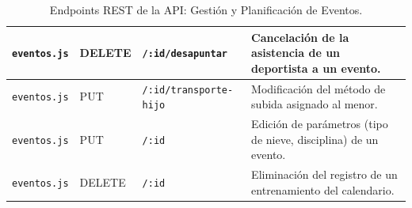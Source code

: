 \begin{table}[htbp]
\begin{tabularx}{\textwidth}{|l|l|l|X|}
        \texttt{eventos.js} & DELETE & \texttt{/:id/desapuntar} & Cancelación de la asistencia de un deportista a un evento. \\ \hline
        \texttt{eventos.js} & PUT & \texttt{/:id/transporte-hijo} & Modificación del método de subida asignado al menor. \\ \hline
        \texttt{eventos.js} & PUT & \texttt{/:id} & Edición de parámetros (tipo de nieve, disciplina) de un evento. \\ \hline
        \texttt{eventos.js} & DELETE & \texttt{/:id} & Eliminación del registro de un entrenamiento del calendario. \\ \hline
        \end{tabularx}
        \caption{Endpoints REST de la API: Gestión y Planificación de Eventos.}
        \label{tab:endpoints_eventos}
        \end{table}


